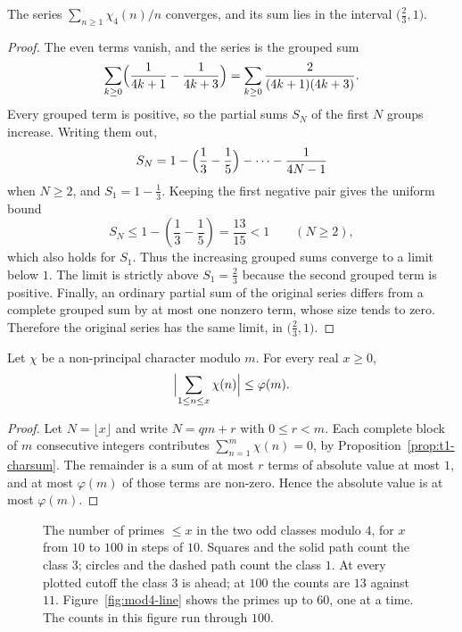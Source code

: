 \begin{proposition}\label{prop:t1-chi4series}
The series $\sum_{n\ge1}\chi_4(n)/n$ converges, and its sum lies in the interval $\bigl(\frac23,1\bigr)$.
\end{proposition}
\begin{proof}
The even terms vanish, and the series is the grouped sum
\[
\sum_{k\ge0}\Bigl(\frac1{4k+1}-\frac1{4k+3}\Bigr)
=\sum_{k\ge0}\frac2{(4k+1)(4k+3)}.
\]
Every grouped term is positive, so the partial sums $S_N$ of the first $N$ groups increase. Writing them out,
\[
S_N=1-\Bigl(\frac13-\frac15\Bigr)-\cdots-\frac1{4N-1}
\]
when $N\ge2$, and $S_1=1-\frac13$. Keeping the first negative pair gives the uniform bound
\[
S_N\le1-\left(\frac13-\frac15\right)=\frac{13}{15}<1
\qquad(N\ge2),
\]
which also holds for $S_1$. Thus the increasing grouped sums converge to a limit below $1$. The limit is strictly above $S_1=\frac23$ because the second grouped term is positive. Finally, an ordinary partial sum of the original series differs from a complete grouped sum by at most one nonzero term, whose size tends to zero. Therefore the original series has the same limit, in $\bigl(\frac23,1\bigr)$.
\end{proof}

\begin{proposition}\label{prop:t1-charbound}
Let $\chi$ be a non-principal character modulo $m$. For every real $x\ge0$,
\[
\Bigl|\sum_{1\le n\le x}\chi(n)\Bigr|\le\varphi(m).
\]
\end{proposition}
\begin{proof}
Let $N=\lfloor x\rfloor$ and write $N=qm+r$ with $0\le r<m$. Each complete block of $m$ consecutive integers contributes $\sum_{n=1}^m\chi(n)=0$, by Proposition~\ref{prop:t1-charsum}. The remainder is a sum of at most $r$ terms of absolute value at most $1$, and at most $\varphi(m)$ of those terms are non-zero. Hence the absolute value is at most $\varphi(m)$.
\end{proof}

\begin{figure}[ht]
\centering
{}
\caption{The number of primes $\le x$ in the two odd classes modulo $4$, for $x$ from $10$ to $100$ in steps of $10$. Squares and the solid path count the class $3$; circles and the dashed path count the class $1$. At every plotted cutoff the class $3$ is ahead; at $100$ the counts are $13$ against $11$. Figure~\ref{fig:mod4-line} shows the primes up to $60$, one at a time. The counts in this figure run through $100$.}
\label{fig:t1-race}
\end{figure}

